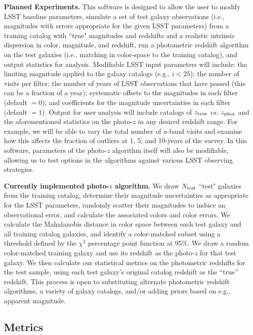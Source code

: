 \textbf{Planned Experiments.} This software is designed to allow the
user to modify LSST baseline parameters, simulate a set of test galaxy
observations (i.e., magnitudes with errors appropriate for the given
LSST parameters) from a training catalog with ``true" magnitudes and
redshifts and a realistic intrinsic dispersion in color, magnitude, and
redshift, run a photometric redshift algorithm on the test galaxies
(i.e., matching in color-space to the training catalog), and output
statistics for analysis. Modifiable LSST input parameters will include:
the limiting magnitude applied to the galaxy catalogs (e.g., $i<25$);
the number of visits per filter; the number of years of LSST
observations that have passed (this can be a fraction of a year);
systematic offsets to the magnitudes in each filter (default $=0$); and
coefficients for the magnitude uncertainties in each filter (default
$=1$).  Output for user analysis will include catalogs of $z_{\rm true}$
$vs.$ $z_{\rm phot}$ and the aforementioned statistics on the photo-$z$
in any desired redshift range. For example, we will be able to vary the
total number of $u$-band visits and examine how this affects the
fraction of outliers at 1, 5, and 10-years of the survey. In this
software, parameters of the photo-$z$ algorithm itself will also be
modifiable, allowing us to test options in the algorithms against
various LSST observing strategies.

\textbf{Currently implemented photo-$z$ algorithm.} We draw $N_{\rm
test}$ ``test" galaxies from the training catalog, determine their
magnitude uncertainties as appropriate for the LSST parameters, randomly
scatter their magnitudes to induce an observational error, and calculate
the associated colors and color errors. We calculate the Mahalanobis
distance in color space between each test galaxy and all training
catalog galaxies, and identify a color-matched subset using a threshold
defined by the $\chi^2$ percentage point function at 95\%. We draw a
random color-matched training galaxy and use its redshift as the
photo-$z$ for that test galaxy. We then calculate our statistical
metrics on the photometric redshifts for the test sample, using each
test galaxy's original catalog redshift as the ``true'' redshift. This
process is open to substituting alternate photometric redshift
algorithms, a variety of galaxy catalogs, and/or adding priors based on
e.g., apparent magnitude.


\subsection{Metrics}

